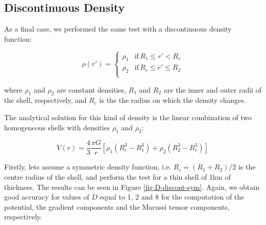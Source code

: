 \documentclass[extra]{gji}
\begin{document}
\subsection{Discontinuous Density}

As a final case, we performed the same test with a discontinuous density function:

\begin{equation}
    \rho(r') = 
    \begin{cases}
        \rho_1 & \text{if} \, R_1 \leq r' < R_c \\
        \rho_2 & \text{if} \, R_c \leq r' \leq R_2 \\
    \end{cases}
\label{eq:density-discontinuous}
\end{equation}

\noindent where $\rho_1$ and $\rho_2$ are constant densities, $R_1$ and $R_2$ are the inner and outer radii of the shell, respectively, and $R_c$ is the the radius on which the 
density changes.

The analytical solution for this kind of density is the linear combination of two homogeneous shells with densities $\rho_1$ and $\rho_2$:

\begin{equation}
    V(r) = \frac{4}{3} \frac{\pi G}{r}
    \left[ \rho_1 (R_c^3 - R_1^3) +
    \rho_2 (R_2^3 - R_c^3) \right]
\end{equation}

Firstly, lets assume a symmetric density function, i.e. $R_c=(R_1 + R_2)/2$ is the centre radius of the shell, and perform the test for a thin shell of 1km of thickness.
The results can be seen in Figure \ref{fig:D-discont-sym}.
Again, we obtain good accuracy for values of $D$ equal to 1, 2 and 8 for the computation of the potential, the gradient components and the Marussi tensor components, respectively.
\end{document}
